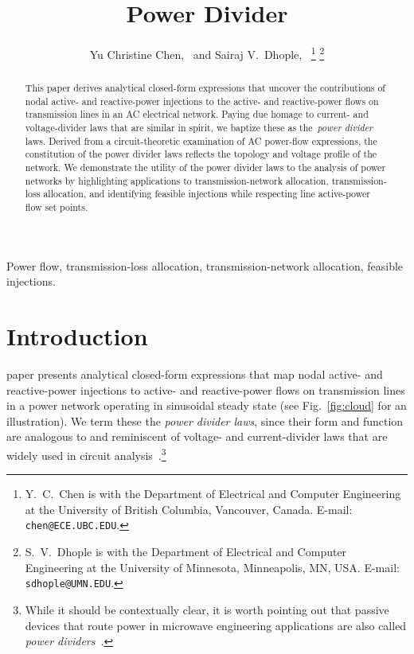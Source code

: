 \documentclass[journal]{IEEEtran}
\theoremstyle{definition}
\begin{document}
\title{Power Divider}
\author{Yu Christine Chen,~ and Sairaj V.~Dhople,~
\thanks{Y.~C.~Chen is with the Department of Electrical and Computer Engineering at the University of British Columbia, Vancouver, Canada.  E-mail: \texttt{chen@ECE.UBC.EDU}.}
\thanks{S.~V.~Dhople is with the Department of Electrical and Computer Engineering at the University of Minnesota, Minneapolis, MN, USA.  E-mail: \texttt{sdhople@UMN.EDU}.}}
\maketitle
\begin{abstract}
\boldmath
This paper derives analytical closed-form expressions that uncover the contributions of nodal active- and reactive-power injections to the active- and reactive-power flows on transmission lines in an AC electrical network. Paying due homage to current- and voltage-divider laws that are similar in spirit, we baptize these as the~\emph{power divider} laws. Derived from a circuit-theoretic examination of AC power-flow expressions, the constitution of the power divider laws reflects the topology and voltage profile of the network. We demonstrate the utility of the power divider laws to the analysis of power networks by highlighting applications to transmission-network allocation, transmission-loss allocation, and identifying feasible injections while respecting line active-power flow set points.
\end{abstract}

\begin{IEEEkeywords}
Power flow, transmission-loss allocation, transmission-network allocation, feasible injections.
\end{IEEEkeywords}
\IEEEpeerreviewmaketitle

\section{Introduction} 
\label{sec:intro}

 paper presents analytical closed-form expressions that map nodal active- and reactive-power injections to active- and reactive-power flows on transmission lines in a power network operating in sinusoidal steady state (see Fig.~\ref{fig:cloud} for an illustration). We term these the \emph{power divider laws}, since their form and function are analogous to and reminiscent of voltage- and current-divider laws that are widely used in circuit analysis~\cite{Sedra-2007}.\footnote{While it should be contextually clear, it is worth pointing out that passive devices that route power in microwave engineering applications are also called \emph{power dividers}~\cite{Wilkinson-1960}.}
\end{document}
